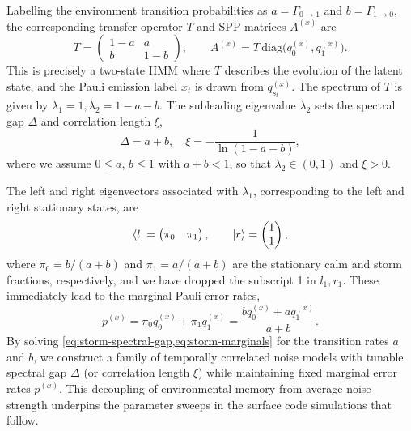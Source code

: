 Labelling the environment transition probabilities as \(a = \Gamma_{0\to 1}\) and \(b = \Gamma_{1\to 0}\), the corresponding transfer operator \(T\) and SPP matrices \(A^{(x)}\) are
\begin{equation}
    T
    =
    \begin{pmatrix}
        1 - a & a \\
        b & 1 - b
    \end{pmatrix},
    \qquad
    A^{(x)} = T\,\mathrm{diag}\big(q_0^{(x)}, q_1^{(x)}\big).
\end{equation}
This is precisely a two-state HMM where \(T\) describes the evolution of the latent state, and the Pauli emission label \(x_t\) is drawn from \(q_{s_t}^{(x)}\). The spectrum of \(T\) is given by \(\lambda_1 = 1, \lambda_2 = 1 - a - b\). The subleading eigenvalue \(\lambda_2\) sets the spectral gap \(\Delta\) and correlation length \(\xi\),
\begin{equation}\label{eq:storm-spectral-gap}
    \Delta = a + b, \quad \xi = -\frac{1}{\ln(1-a-b)},
\end{equation}
where we assume \(0 \le a\), \(b \le 1\) with \(a + b < 1\), so that \(\lambda_2 \in (0, 1)\) and \(\xi > 0\).

The left and right eigenvectors associated with \(\lambda_1\), corresponding to the left and right stationary states, are
\begin{equation}\label{eq:storm-stationary-states}
    \bra{l} =
    \begin{pmatrix}
        \pi_0 & \pi_1
    \end{pmatrix},
    \qquad
    \ket{r} =
    \begin{pmatrix}
        1 \\
        1
    \end{pmatrix},
\end{equation}
where \(\pi_0 = b/(a+b)\) and \(\pi_1 = a/(a+b)\) are the stationary calm and storm fractions, respectively, and we have dropped the subscript 1 in \(l_1, r_1\). These immediately lead to the marginal Pauli error rates,
\begin{equation}\label{eq:storm-marginals}
    \bar{p}^{(x)}
    = \pi_0 q_0^{(x)} + \pi_1 q_1^{(x)} = \frac{bq_0^{(x)} + aq_1^{(x)}}{a+b}.
\end{equation}
By solving \cref{eq:storm-spectral-gap,eq:storm-marginals} for the transition rates \(a\) and \(b\), we construct a family of temporally correlated noise models with tunable spectral gap \(\Delta\) (or correlation length \(\xi\)) while maintaining fixed marginal error rates \(\bar{p}^{(x)}\). This decoupling of environmental memory from average noise strength underpins the parameter sweeps in the surface code simulations that follow.

